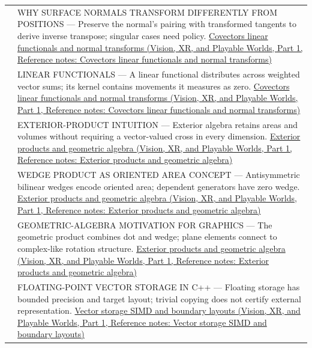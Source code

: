 {\begin{longtable}[]{@{}
  >{\raggedright\arraybackslash}p{}
  >{\raggedright\arraybackslash}p{}@{}}
582 & WHY SURFACE NORMALS TRANSFORM DIFFERENTLY FROM POSITIONS --- Preserve the normal's pairing with transformed tangents to derive inverse transpose; singular cases need policy. \href{../07-Vision-XR-and-Playable-Worlds-P01/main.pdf\#nameddest=appendix-46da295c6787}{Covectors linear functionals and normal transforms (Vision, XR, and Playable Worlds, Part 1, Reference notes: Covectors linear functionals and normal transforms)} \\
583 & LINEAR FUNCTIONALS --- A linear functional distributes across weighted vector sums; its kernel contains movements it measures as zero. \href{../07-Vision-XR-and-Playable-Worlds-P01/main.pdf\#nameddest=appendix-46da295c6787}{Covectors linear functionals and normal transforms (Vision, XR, and Playable Worlds, Part 1, Reference notes: Covectors linear functionals and normal transforms)} \\
584 & EXTERIOR-PRODUCT INTUITION --- Exterior algebra retains areas and volumes without requiring a vector-valued cross in every dimension. \href{../07-Vision-XR-and-Playable-Worlds-P01/main.pdf\#nameddest=appendix-e1960925d1b8}{Exterior products and geometric algebra (Vision, XR, and Playable Worlds, Part 1, Reference notes: Exterior products and geometric algebra)} \\
585 & WEDGE PRODUCT AS ORIENTED AREA CONCEPT --- Antisymmetric bilinear wedges encode oriented area; dependent generators have zero wedge. \href{../07-Vision-XR-and-Playable-Worlds-P01/main.pdf\#nameddest=appendix-e1960925d1b8}{Exterior products and geometric algebra (Vision, XR, and Playable Worlds, Part 1, Reference notes: Exterior products and geometric algebra)} \\
586 & GEOMETRIC-ALGEBRA MOTIVATION FOR GRAPHICS --- The geometric product combines dot and wedge; plane elements connect to complex-like rotation structure. \href{../07-Vision-XR-and-Playable-Worlds-P01/main.pdf\#nameddest=appendix-e1960925d1b8}{Exterior products and geometric algebra (Vision, XR, and Playable Worlds, Part 1, Reference notes: Exterior products and geometric algebra)} \\
587 & FLOATING-POINT VECTOR STORAGE IN C++ --- Floating storage has bounded precision and target layout; trivial copying does not certify external representation. \href{../07-Vision-XR-and-Playable-Worlds-P01/main.pdf\#nameddest=appendix-26bf6bf2fb8b}{Vector storage SIMD and boundary layouts (Vision, XR, and Playable Worlds, Part 1, Reference notes: Vector storage SIMD and boundary layouts)} \\

\end{longtable}}
